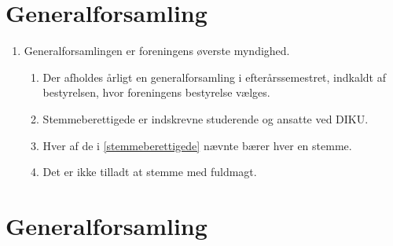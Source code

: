 \documentclass[a4paper]{article}
\newenvironment{stykenum}{
  \begin{enumerate}[%
    label=Stk.~\arabic*., ref=\theenumi~Stk.~\arabic*, start=2]
}{\end{enumerate}}
\begin{document}
\section*{Generalforsamling}

\begin{enumerate}[resume*=afsnit]

\item Generalforsamlingen er foreningens øverste myndighed.

  \begin{stykenum}

  \item Der afholdes årligt en generalforsamling i efterårssemestret, indkaldt
        af bestyrelsen, hvor foreningens bestyrelse vælges.

  \item \label{stemmeberettigede} Stemmeberettigede er indskrevne studerende og
        ansatte ved DIKU.

  \item Hver af de i \ref{stemmeberettigede} nævnte bærer hver en stemme.

  \item Det er ikke tilladt at stemme med fuldmagt.

  \end{stykenum}

\end{enumerate}


\section*{Generalforsamling}
\end{document}
